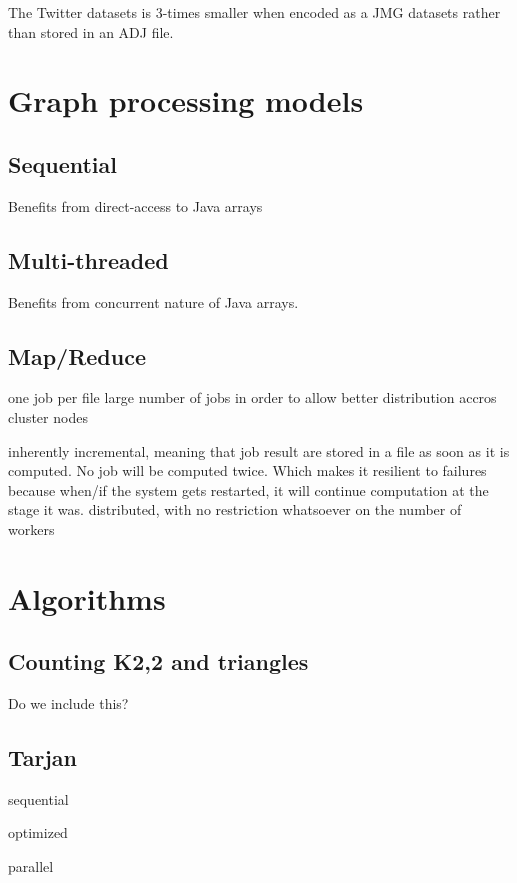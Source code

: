 \documentclass[11pt,a4paper]{article}
\begin{document}
The Twitter datasets is 3-times smaller when encoded as a JMG datasets rather than stored in an ADJ file.


\section{Graph processing models}

\subsection{Sequential}

Benefits from direct-access to Java arrays

\subsection{Multi-threaded}

Benefits from concurrent nature of Java arrays.


\subsection{Map/Reduce}
one job per file
large number of jobs in order to allow better distribution accros cluster nodes

inherently incremental, meaning that job result are stored in a file as soon as it is computed. No job will be computed twice. Which makes it resilient to failures because when/if the system gets restarted, it will continue computation at the stage it was.
distributed, with no restriction whatsoever on the number of workers 

\section{Algorithms}

\subsection{Counting K2,2 and triangles}

Do we include this?

\subsection{Tarjan}

sequential

optimized

parallel
\end{document}
